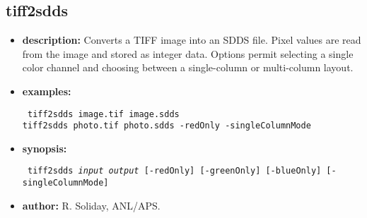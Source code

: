 \newpage
\subsection{tiff2sdds}
\label{tiff2sdds}

\begin{itemize}
  \item {\bf description:} Converts a TIFF image into an SDDS file.  Pixel values are read from the image and stored as integer data.  Options permit selecting a single color channel and choosing between a single-column or multi-column layout.
  \item {\bf examples:}
  \begin{flushleft}{\tt
    tiff2sdds image.tif image.sdds\\
    tiff2sdds photo.tif photo.sdds -redOnly -singleColumnMode
  }\end{flushleft}
  \item {\bf synopsis:}
  \begin{flushleft}{\tt
    tiff2sdds {\em input} {\em output} [-redOnly] [-greenOnly] [-blueOnly] [-singleColumnMode]
  }\end{flushleft}
  \item {\bf author:} R. Soliday, ANL/APS.
\end{itemize}
